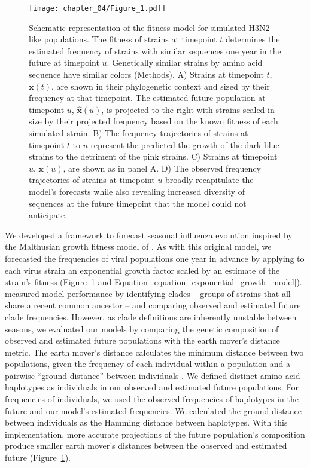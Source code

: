 \begin{figure}
  \begin{center}
  \texttt{[image: chapter\_04/Figure\_1.pdf]}
  \caption{
    Schematic representation of the fitness model for simulated H3N2-like populations.
    The fitness of strains at timepoint $t$ determines the estimated frequency of strains with similar sequences one year in the future at timepoint $u$.
    Genetically similar strains by amino acid sequence have similar colors (Methods).
    A) Strains at timepoint $t$, $\mathbf{x}(t)$, are shown in their phylogenetic context and sized by their frequency at that timepoint.
    The estimated future population at timepoint $u$, $\mathbf{\hat{x}}(u)$, is projected to the right with strains scaled in size by their projected frequency based on the known fitness of each simulated strain.
    B) The frequency trajectories of strains at timepoint $t$ to $u$ represent the predicted the growth of the dark blue strains to the detriment of the pink strains.
    C) Strains at timepoint $u$, $\mathbf{x}(u)$, are shown as in panel A.
    D) The observed frequency trajectories of strains at timepoint $u$ broadly recapitulate the model's forecasts while also revealing increased diversity of sequences at the future timepoint that the model could not anticipate.
  }
  \label{fig:model}
  \end{center}
\end{figure}

We developed a framework to forecast seasonal influenza evolution inspired by the Malthusian growth fitness model of \cite{Luksza:2014hj}.
As with this original model, we forecasted the frequencies of viral populations one year in advance by applying to each virus strain an exponential growth factor scaled by an estimate of the strain's fitness (Figure~\ref{fig:model} and Equation~\ref{equation_exponential_growth_model}).
\cite{Luksza:2014hj} measured model performance by identifying clades -- groups of strains that all share a recent common ancestor -- and comparing observed and estimated future clade frequencies.
However, as clade definitions are inherently unstable between seasons, we evaluated our models by comparing the genetic composition of observed and estimated future populations with the earth mover's distance metric.
The earth mover's distance calculates the minimum distance between two populations, given the frequency of each individual within a population and a pairwise ``ground distance'' between individuals \citep{Rubner1998}.
We defined distinct amino acid haplotypes as individuals in our observed and estimated future populations.
For frequencies of individuals, we used the observed frequencies of haplotypes in the future and our model's estimated frequencies.
We calculated the ground distance between individuals as the Hamming distance between haplotypes.
With this implementation, more accurate projections of the future population's composition produce smaller earth mover's distances between the observed and estimated future (Figure~\ref{fig:model}).


